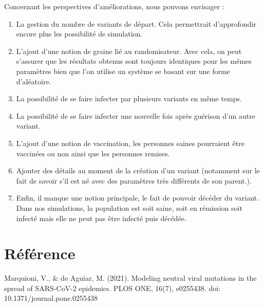 \documentclass{article}
\begin{document}
Concernant les perspectives d'améliorations, nous pouvons envisager :
\begin{enumerate}
    \item La gestion du nombre de variants de départ. Cela permettrait d'approfondir encore plus les possibilité de simulation. 
    \item L'ajout d'une notion de graine lié au randomisateur. Avec cela, on peut s'assurer que les résultats obtenus sont toujours identiques pour les mêmes paramètres bien que l'on utilise un système se basant sur une forme d'aléatoire. 
    \item La possibilité de se faire infecter par plusieurs variants en même temps. 
    \item La possibilité de se faire infecter une nouvelle fois après guérison d'un autre variant. 
    \item L'ajout d'une notion de vaccination, les personnes saines pourraient être vaccinées ou non ainsi que les personnes remises. 
    \item Ajouter des détails au moment de la création d'un variant (notamment sur le fait de savoir s'il est né avec des paramètres très différents de son parent.).
    \item Enfin, il manque une notion principale, le fait de pouvoir décéder du variant. Dans nos simulations, la population est soit saine, soit en rémission soit infecté mais elle ne peut pas être infecté puis décédée.
\end{enumerate}

\section{Référence}

Marquioni, V., & de Aguiar, M. (2021). Modeling neutral viral mutations in the spread of SARS-CoV-2 epidemics. PLOS ONE, 16(7), e0255438. doi: 10.1371/journal.pone.0255438
\end{document}
